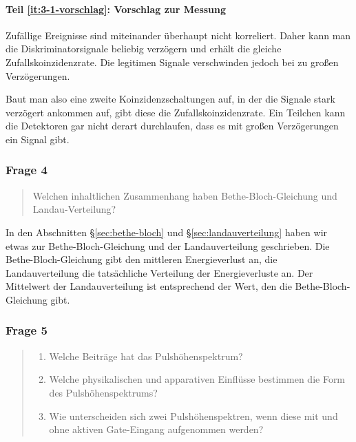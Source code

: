 \documentclass[11pt, ngerman, fleqn, DIV=15, headinclude, BCOR=2cm]{scrreprt}
\begin{document}
\paragraph{Teil \ref{it:3-1-vorschlag}: Vorschlag zur Messung}

Zufällige Ereignisse sind miteinander überhaupt nicht korreliert. Daher kann
man die Diskriminatorsignale beliebig verzögern und erhält die gleiche
Zufallskoinzidenzrate. Die legitimen Signale verschwinden jedoch bei zu großen
Verzögerungen.

Baut man also eine zweite Koinzidenzschaltungen auf, in der die Signale stark
verzögert ankommen auf, gibt diese die Zufallskoinzidenzrate. Ein Teilchen kann
die Detektoren gar nicht derart durchlaufen, dass es mit großen Verzögerungen
ein Signal gibt.

\subsubsection{Frage 4}

\begin{quote}
    Welchen inhaltlichen Zusammenhang haben Bethe-Bloch-Gleichung und
    Landau-Verteilung?
\end{quote}

In den Abschnitten §\ref{sec:bethe-bloch} und §\ref{sec:landauverteilung} haben
wir etwas zur Bethe-Bloch-Gleichung und der Landauverteilung geschrieben. Die
Bethe-Bloch-Gleichung gibt den mittleren Energieverlust an, die
Landauverteilung die tatsächliche Verteilung der Energieverluste an. Der
Mittelwert der Landauverteilung ist entsprechend der Wert, den die
Bethe-Bloch-Gleichung gibt.

\subsubsection{Frage 5}

\begin{quote}
    \begin{enumerate}
        \item
            \label{it:1-5-beitrag}
            Welche Beiträge hat das Pulshöhenspektrum?

        \item
            \label{it:1-5-einfluss}
            Welche physikalischen und apparativen Einflüsse bestimmen die Form
            des Pulshöhenspektrums?

        \item
            \label{it:1-5-unterschied}
            Wie unterscheiden sich zwei Pulshöhenspektren, wenn diese mit und
            ohne aktiven Gate-Eingang aufgenommen werden?
    \end{enumerate}
\end{quote}
\end{document}
